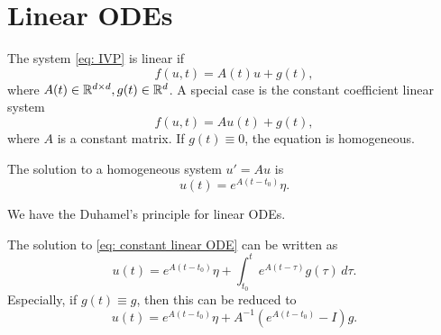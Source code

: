 \section{Linear ODEs} 

\begin{definition}
\label{def: Linear ODEs}
The system \eqref{eq: IVP} is linear if 
\begin{equation}
\label{eq: linear ODE}
    f(u,t) = A(t)u + g(t),
\end{equation}
where $ A(t) \in \mathbb{R}^{d\times d}, g(t) \in \mathbb{R}^{d} $. A special case is the constant coefficient linear system
\begin{equation}
\label{eq: constant linear ODE}
    f(u,t) = Au(t) + g(t), 
\end{equation}
where $ A $ is a constant matrix. If $ g(t)\equiv 0 $, the equation is homogeneous. 
\end{definition}
 
The solution to a homogeneous system $ u' = Au $ is 
\[
    u(t) = e^{A(t-t_0)}\eta . 
\]

We have the Duhamel's principle for linear ODEs. 

\begin{theorem}
\label{thm: Duhamel's principle}
The solution to \eqref{eq: constant linear ODE} can be written as 
\begin{equation}
\label{eq: Duhamel's principle}
    u(t) = e^{A(t-t_0)}\eta  + \int_{t_0}^{t} e^{A(t-\tau )}g(\tau)\, d\tau. 
\end{equation}
Especially, if $ g(t)\equiv g$, then this can be reduced to 
\begin{equation}
\label{eq: Duhamel's principle g constant}
    u(t) = e^{A(t-t_0)}\eta  + A^{-1}  (e^{A(t-t_0)}-I) g. 
\end{equation}

\end{theorem}
